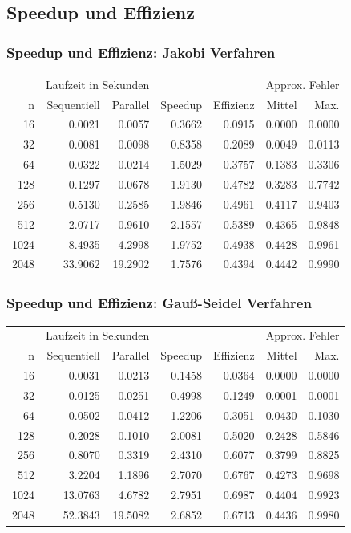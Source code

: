\documentclass{beamer}
\begin{document}
\subsection{Speedup und Effizienz}
\begin{frame}
    \frametitle{Speedup und Effizienz: Jakobi Verfahren}
    \small
    \begin{tabular}{|r|r|r|r|r|r|r|} \hline
    & \multicolumn{2}{c|}{Laufzeit in Sekunden} & & & \multicolumn{2}{c|}{Approx. Fehler} \\
    n    & Sequentiell & Parallel & Speedup & Effizienz & Mittel & Max.   \\ \hline \hline
    16   & 0.0021      & 0.0057   & 0.3662  & 0.0915    & 0.0000 & 0.0000 \\
    32   & 0.0081      & 0.0098   & 0.8358  & 0.2089    & 0.0049 & 0.0113 \\
    64   & 0.0322      & 0.0214   & 1.5029  & 0.3757    & 0.1383 & 0.3306 \\
    128  & 0.1297      & 0.0678   & 1.9130  & 0.4782    & 0.3283 & 0.7742 \\
    256  & 0.5130      & 0.2585   & 1.9846  & 0.4961    & 0.4117 & 0.9403 \\
    512  & 2.0717      & 0.9610   & 2.1557  & 0.5389    & 0.4365 & 0.9848 \\
    1024 & 8.4935      & 4.2998   & 1.9752  & 0.4938    & 0.4428 & 0.9961 \\
    2048 & 33.9062     & 19.2902  & 1.7576  & 0.4394    & 0.4442 & 0.9990 \\ \hline
    \end{tabular}
\end{frame}

\begin{frame}
    \frametitle{Speedup und Effizienz: Gauß-Seidel Verfahren}
    \small
    \begin{tabular}{|r|r|r|r|r|r|r|} \hline
    & \multicolumn{2}{c|}{Laufzeit in Sekunden} & & & \multicolumn{2}{c|}{Approx. Fehler} \\
    n    & Sequentiell & Parallel & Speedup & Effizienz & Mittel & Max.   \\ \hline \hline
    16   & 0.0031      & 0.0213   & 0.1458  & 0.0364    & 0.0000 & 0.0000 \\
    32   & 0.0125      & 0.0251   & 0.4998  & 0.1249    & 0.0001 & 0.0001 \\
    64   & 0.0502      & 0.0412   & 1.2206  & 0.3051    & 0.0430 & 0.1030 \\
    128  & 0.2028      & 0.1010   & 2.0081  & 0.5020    & 0.2428 & 0.5846 \\
    256  & 0.8070      & 0.3319   & 2.4310  & 0.6077    & 0.3799 & 0.8825 \\
    512  & 3.2204      & 1.1896   & 2.7070  & 0.6767    & 0.4273 & 0.9698 \\
    1024 & 13.0763     & 4.6782   & 2.7951  & 0.6987    & 0.4404 & 0.9923 \\
    2048 & 52.3843     & 19.5082  & 2.6852  & 0.6713    & 0.4436 & 0.9980 \\ \hline
    \end{tabular}
\end{frame}
\end{document}
